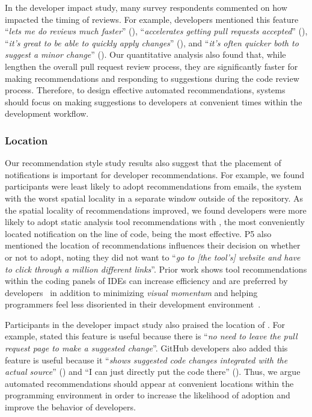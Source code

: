In the developer impact study, many survey respondents commented on how \suggs impacted the timing of reviews. For example, developers mentioned this feature ``\textit{lets me do reviews much faster}'' (), ``\textit{accelerates getting pull requests accepted}'' (), ``\textit{it's great to be able to quickly apply changes}'' (), and ``\textit{it's often quicker both to suggest a minor change}'' (). Our quantitative analysis also found that, while \sugg lengthen the overall pull request review process, they are significantly faster for making recommendations and responding to suggestions during the code review process. Therefore, to design effective automated recommendations, systems should focus on making suggestions to developers at convenient times within the development workflow. 

\subsubsection{Location}

Our recommendation style study results also suggest that the placement of notifications is important for developer recommendations. For example, we found participants were least likely to adopt recommendations from emails, the system with the worst spatial locality in a separate window outside of the repository. As the spatial locality of recommendations improved, we found developers were more likely to adopt static analysis tool recommendations with \suggs, the most conveniently located notification on the line of code, being the most effective. P5 also mentioned the location of recommendations influences their decision on whether or not to adopt, noting they did not want to ``\textit{go to [the tool's] website and have to click through a million different links}''. Prior work shows tool recommendations within the coding panels of IDEs can increase efficiency and are preferred by developers~\cite{Flower} in addition to minimizing \textit{visual momentum} and helping programmers feel less disoriented in their development environment~\cite{de2006using}.

Participants in the developer impact study also praised the location of \sugg. For example,  stated this feature is useful because there is ``\textit{no need to leave the pull request page to make a suggested change}''. GitHub developers also added this feature is useful because it ``\textit{shows suggested code changes integrated with the actual source}'' () and ``I can just directly put the code there'' (). Thus, we argue automated recommendations should appear at convenient locations within the programming environment in order to increase the likelihood of adoption and improve the behavior of developers. \\


